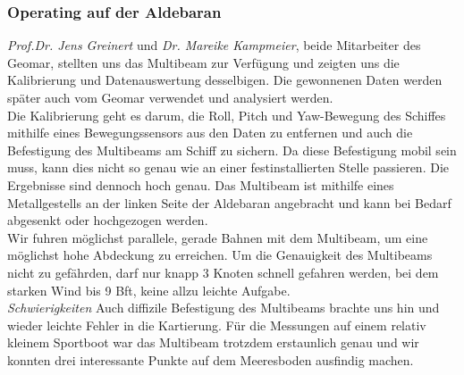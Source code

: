 \subsubsection{Operating auf der Aldebaran}
\emph{Prof.Dr. Jens Greinert} und \emph{Dr. Mareike Kampmeier}, beide Mitarbeiter des Geomar, stellten uns das Multibeam zur Verfügung und zeigten uns die Kalibrierung und Datenauswertung desselbigen. Die gewonnenen Daten werden später auch vom Geomar verwendet und analysiert werden. \\

Die Kalibrierung geht es darum, die Roll, Pitch und Yaw-Bewegung des Schiffes mithilfe eines Bewegungssensors aus den Daten zu 
entfernen und auch die Befestigung des Multibeams am Schiff zu sichern. Da diese Befestigung mobil sein muss, kann
dies nicht so genau wie an einer festinstallierten Stelle passieren. Die Ergebnisse sind dennoch hoch genau. 
Das Multibeam ist mithilfe eines Metallgestells an der linken Seite der Aldebaran angebracht und kann bei Bedarf 
abgesenkt oder hochgezogen werden.\\

Wir fuhren möglichst parallele, gerade Bahnen mit dem Multibeam, um eine möglichst hohe Abdeckung zu erreichen. 
Um die Genauigkeit des Multibeams nicht zu gefährden, darf nur knapp 3 Knoten schnell gefahren werden, bei dem starken Wind bis 9 Bft, keine allzu leichte Aufgabe. \\

\emph{Schwierigkeiten}
Auch diffizile Befestigung des Multibeams brachte uns hin und wieder leichte Fehler in die Kartierung. Für die Messungen auf einem relativ kleinem Sportboot war das Multibeam trotzdem erstaunlich genau und wir konnten drei interessante Punkte auf dem 
Meeresboden ausfindig machen. \\

